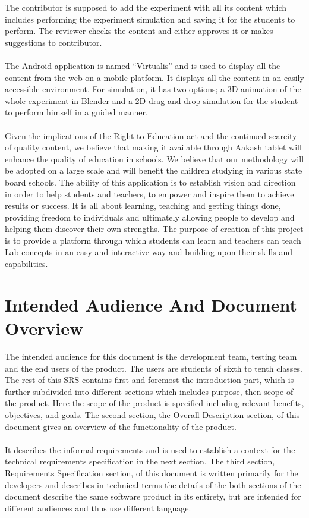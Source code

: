 \documentclass[12pt]{report}
\begin{document}
The contributor is supposed to add the experiment with all its content which includes performing the experiment simulation and saving it for the students to perform. The reviewer checks the content and either approves it or makes suggestions to contributor.
\\
\\
The Android application is named “Virtualis” and is used to display all the content from the web on a mobile platform. It displays all the content in an easily accessible environment. For simulation, it has two options; a 3D animation of the whole experiment in Blender and a 2D drag and drop simulation for the student to perform himself in a guided manner.
\\
\\
Given the implications of the Right to Education act and the continued scarcity of quality content, we believe that making it available through Aakash tablet will enhance the quality of education in schools. We believe that our methodology will be adopted on a large scale and will benefit the children studying in various state board schools. The ability of this application is to establish vision and direction in order to help students and teachers, to empower and inspire them to achieve results or success. It is all about learning, teaching and getting things done, providing freedom to individuals and ultimately allowing people to develop and helping them discover their own strengths. The purpose of creation of this project is to provide a platform through which students can learn and teachers can teach Lab concepts in an easy and interactive way and building upon their skills and capabilities.

\section{Intended Audience And Document Overview}

The intended audience for this document is the development team, testing team and the end users of the product. The users are students of sixth to tenth classes. The rest of this SRS contains first and foremost the introduction part, which is further subdivided into different sections which includes purpose, then scope of the product. Here the scope of the product is specified including relevant benefits, objectives, and goals. The second section, the Overall Description section, of this document gives an overview of the functionality of the product. \\
\\
It describes the informal requirements and is used to establish a context for the technical requirements specification in the next section. The third section, Requirements Specification section, of this document is written primarily for the developers and describes in technical terms the details of the both sections of the document describe the same software product in its entirety, but are intended for different audiences and thus use different language.
\pagebreak
\end{document}
